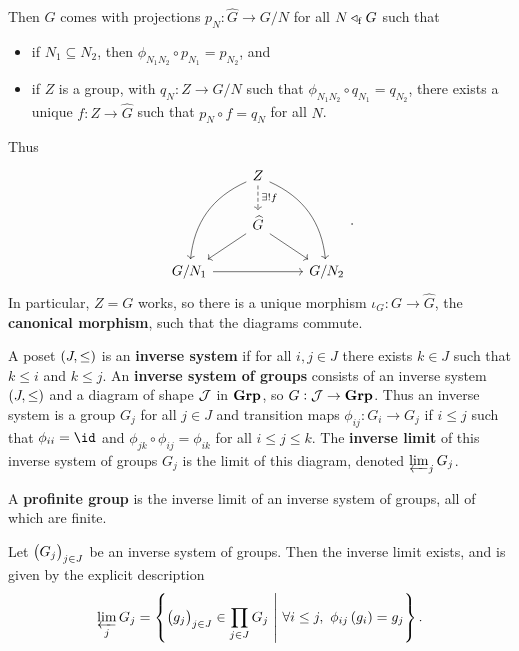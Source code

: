 Then $ G $ comes with projections $ p_N : \widehat{G} \to G / N $ for all $ N \triangleleft_{\mathrm{f}} G $ such that
\begin{itemize}
\item if $ N_1 \subseteq N_2 $, then $ \phi_{N_1N_2} \circ p_{N_1} = p_{N_2} $, and
\item if $ Z $ is a group, with $ q_N : Z \to G / N $ such that $ \phi_{N_1N_2} \circ q_{N_1} = q_{N_2} $, there exists a unique $ f : Z \to \widehat{G} $ such that $ p_N \circ f = q_N $ for all $ N $.
\end{itemize}
Thus
$$
\begin{tikzcd}
& Z \arrow[dashed]{d}{\exists !f} \arrow[bend right=30]{ddl} \arrow[bend left=30]{ddr} & \\
& \widehat{G} \arrow{dl} \arrow{dr} & \\
G / N_1 \arrow{rr} & & G / N_2
\end{tikzcd}.
$$
In particular, $ Z = G $ works, so there is a unique morphism $ \iota_G : G \to \widehat{G} $, the \textbf{canonical morphism}, such that the diagrams commute.

\begin{definition*}
A poset $ \br{J, \le} $ is an \textbf{inverse system} if for all $ i, j \in J $ there exists $ k \in J $ such that $ k \le i $ and $ k \le j $. An \textbf{inverse system of groups} consists of an inverse system $ \br{J, \le} $ and a diagram of shape $ \mathcal{J} $ in $ \textbf{Grp} $, so $ G : \mathcal{J} \to \textbf{Grp} $. Thus an inverse system is a group $ G_j $ for all $ j \in J $ and transition maps $ \phi_{ij} : G_i \to G_j $ if $ i \le j $ such that $ \phi_{ii} = \id $ and $ \phi_{jk} \circ \phi_{ij} = \phi_{ik} $ for all $ i \le j \le k $. The \textbf{inverse limit} of this inverse system of groups $ G_j $ is the limit of this diagram, denoted $ \varprojlim_j G_j $.
\end{definition*}

\begin{definition*}
A \textbf{profinite group} is the inverse limit of an inverse system of groups, all of which are finite.
\end{definition*}

\begin{proposition}
Let $ \br{G_j}_{j \in J} $ be an inverse system of groups. Then the inverse limit exists, and is given by the explicit description
$$ \varprojlim_j G_j = \cbr{\br{g_j}_{j \in J} \in \prod_{j \in J} G_j \st \forall i \le j, \ \phi_{ij}\br{g_i} = g_j}. $$
\end{proposition}

